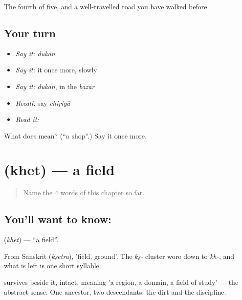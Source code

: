 \begin{grammarlens}[title={What you've built}]
The fourth of five, and a well-travelled road you have walked before.
\end{grammarlens}

\subsection*{Your turn}
\begin{itemize}
\raggedright
  \item \emph{Say it:} \emph{dukān}
  \item \emph{Say it:} it once more, slowly
  \item \emph{Say it:} \emph{dukān}, in the \emph{bāzār}
  \item \emph{Recall:} say \emph{chiṛiyā}
  \item \emph{Read it:} \textbf{}
\end{itemize}

\begin{tcolorbox}[breakable,colback=teal!4,colframe=teal!35!black,title={Before you move on}]
What does  mean? (\textquotedblleft{}a shop\textquotedblright{}.) Say it once more.
\end{tcolorbox}
\section[\texorpdfstring{\hi{खेत} (khet)}{खेत (khet)}]{ (khet) — a field}

\label{lesson:HI-C56-field}



\begin{quote}
Name the 4 words of this chapter so far.
\end{quote}

\subsection*{You'll want to know: }
\textbf{} (\emph{khet}) — \textquotedblleft{}a field\textquotedblright{}.

From Sanskrit  (\emph{kṣetra}), 'field, ground'. The \emph{kṣ-} cluster wore down to \emph{kh-}, and what is left is one short syllable.

 survives beside it, intact, meaning 'a region, a domain, a field of study' — the abstract sense. One ancestor, two descendants: the dirt and the discipline.

